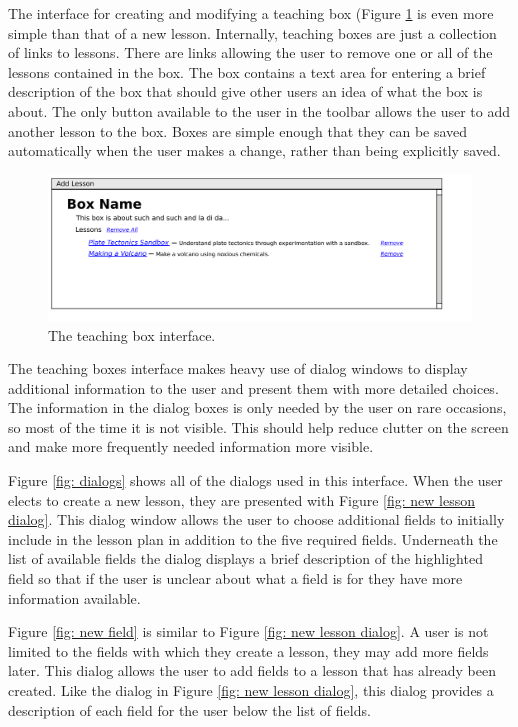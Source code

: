 \documentclass[10pt,letter]{article}
\begin{document}
The interface for creating and modifying a teaching box (Figure \ref{fig: new box}
is even more simple than that of a new lesson. Internally, teaching boxes are
just a collection of links to lessons. There are links allowing the user to
remove one or all of the lessons contained in the box. The box contains a text
area for entering a brief description of the box that should give other users an
idea of what the box is about. The only button available to the user in the
toolbar allows the user to add another lesson to the box. Boxes are simple
enough that they can be saved automatically when the user makes a change, rather
than being explicitly saved.

\begin{figure}
	\centering
	\includegraphics[width=0.9\linewidth]{../../low-fi_prototype/teaching_box}
	\caption{The teaching box interface.}
	\label{fig: new box}
\end{figure}

The teaching boxes interface makes heavy use of dialog windows to display
additional information to the user and present them with more detailed choices.
The information in the dialog boxes is only needed by the user on rare
occasions, so most of the time it is not visible. This should help reduce
clutter on the screen and make more frequently needed information more visible.

Figure \ref{fig: dialogs} shows all of the dialogs used in this interface. When
the user elects to create a new lesson, they are presented with Figure
\ref{fig: new lesson dialog}. This dialog window allows the user to choose
additional fields to initially include in the lesson plan in addition to the
five required fields. Underneath the list of available fields the dialog
displays a brief description of the highlighted field so that if the user is
unclear about what a field is for they have more information available.

Figure \ref{fig: new field} is similar to Figure \ref{fig: new lesson dialog}. A
user is not limited to the fields with which they create a lesson, they may add
more fields later. This dialog allows the user to add fields to a lesson that
has already been created. Like the dialog in Figure \ref{fig: new lesson dialog},
this dialog provides a description of each field for the user below the list of
fields.
\end{document}
